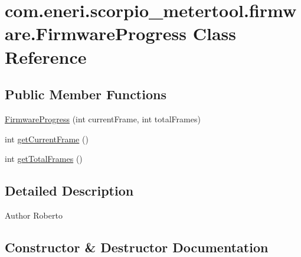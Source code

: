 \hypertarget{classcom_1_1eneri_1_1scorpio__metertool_1_1firmware_1_1_firmware_progress}{}\section{com.\+eneri.\+scorpio\+\_\+metertool.\+firmware.\+Firmware\+Progress Class Reference}
\label{classcom_1_1eneri_1_1scorpio__metertool_1_1firmware_1_1_firmware_progress}
\subsection*{Public Member Functions}
\begin{DoxyCompactItemize}
\item 
\hyperlink{classcom_1_1eneri_1_1scorpio__metertool_1_1firmware_1_1_firmware_progress_a2dd0a4520ed8ef79ab05a44a0cbf8813}{Firmware\+Progress} (int current\+Frame, int total\+Frames)
\item 
int \hyperlink{classcom_1_1eneri_1_1scorpio__metertool_1_1firmware_1_1_firmware_progress_af01b85fe6f4bfb0081d033c80e43f7d6}{get\+Current\+Frame} ()
\item 
int \hyperlink{classcom_1_1eneri_1_1scorpio__metertool_1_1firmware_1_1_firmware_progress_a814e734add2076c5104288a71d323eaa}{get\+Total\+Frames} ()
\end{DoxyCompactItemize}


\subsection{Detailed Description}
\begin{DoxyAuthor}{Author}
Roberto 
\end{DoxyAuthor}


\subsection{Constructor \& Destructor Documentation}
\mbox{\label{classcom_1_1eneri_1_1scorpio__metertool_1_1firmware_1_1_firmware_progress_a2dd0a4520ed8ef79ab05a44a0cbf8813}} 
